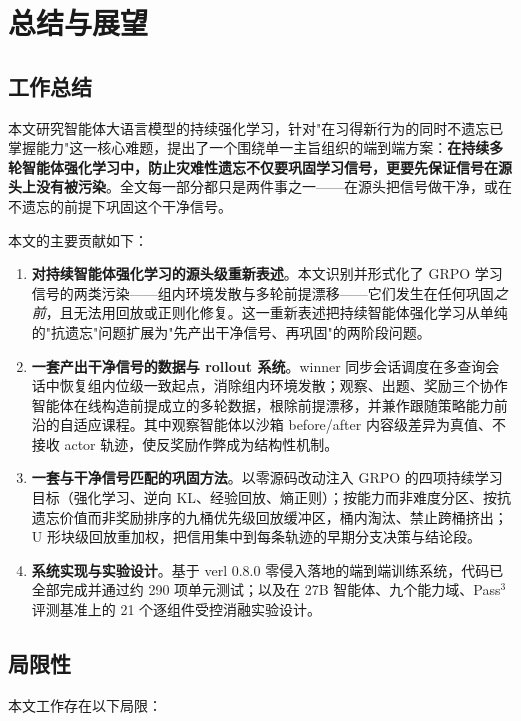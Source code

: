 \chapter{总结与展望}
\label{chap:conclusion}

\section{工作总结}
\label{sec:concl-summary}

本文研究智能体大语言模型的持续强化学习，针对"在习得新行为的同时不遗忘已掌握能力"这一核心难题，提出了一个围绕单一主旨组织的端到端方案：\textbf{在持续多轮智能体强化学习中，防止灾难性遗忘不仅要巩固学习信号，更要先保证信号在源头上没有被污染}。全文每一部分都只是两件事之一——在源头把信号做干净，或在不遗忘的前提下巩固这个干净信号。

本文的主要贡献如下：

\begin{enumerate}
  \item \textbf{对持续智能体强化学习的源头级重新表述}。本文识别并形式化了 GRPO 学习信号的两类污染——组内环境发散与多轮前提漂移——它们发生在任何巩固\textit{之前}，且无法用回放或正则化修复。这一重新表述把持续智能体强化学习从单纯的"抗遗忘"问题扩展为"先产出干净信号、再巩固"的两阶段问题。
  \item \textbf{一套产出干净信号的数据与 rollout 系统}。winner 同步会话调度在多查询会话中恢复组内位级一致起点，消除组内环境发散；观察、出题、奖励三个协作智能体在线构造前提成立的多轮数据，根除前提漂移，并兼作跟随策略能力前沿的自适应课程。其中观察智能体以沙箱 before/after 内容级差异为真值、不接收 actor 轨迹，使反奖励作弊成为结构性机制。
  \item \textbf{一套与干净信号匹配的巩固方法}。以零源码改动注入 GRPO 的四项持续学习目标（强化学习、逆向 KL、经验回放、熵正则）；按能力而非难度分区、按抗遗忘价值而非奖励排序的九桶优先级回放缓冲区，桶内淘汰、禁止跨桶挤出；U 形块级回放重加权，把信用集中到每条轨迹的早期分支决策与结论段。
  \item \textbf{系统实现与实验设计}。基于 verl 0.8.0 零侵入落地的端到端训练系统，代码已全部完成并通过约 290 项单元测试；以及在 27B 智能体、九个能力域、Pass$^3$ 评测基准上的 21 个逐组件受控消融实验设计。
\end{enumerate}

\section{局限性}
\label{sec:concl-limit}

本文工作存在以下局限：

